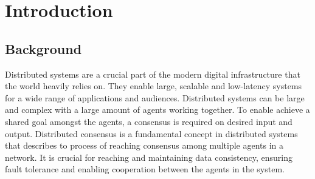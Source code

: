 \section{Introduction}
\thispagestyle{empty}

\subsection{Background}




Distributed systems are a crucial part of the modern digital infrastructure that the world heavily relies on. They enable large, scalable and low-latency systems for a wide range of applications and audiences. Distributed systems can be large and complex with a large amount of agents working together. To enable achieve a shared goal amongst the agents, a consensus is required on desired input and output. Distributed consensus is a fundamental concept in distributed systems that describes to process of reaching consensus among multiple agents in a network. It is crucial for reaching and maintaining data consistency, ensuring fault tolerance and enabling cooperation between the agents in the system. 

